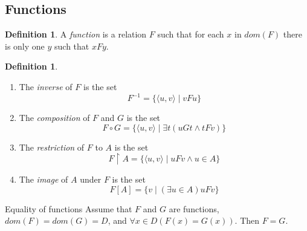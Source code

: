 \documentclass[letterpaper, 10pt]{article}
\numberwithin{thm}{section}
\theoremstyle{definition}
\newtheorem{mydef}[thm]{Definition}
\newcommand{\opair}[2]{\langle{#1}, {#2} \rangle}
\newcommand{\myset}[2]{\{{#1} \mid {#2}\}}
\begin{document}
\subsection{Functions}

\begin{mydef}
	A \emph{function} is a relation $F$ such that for each $x$ in $dom(F)$
	there is only one $y$ such that $xFy$.
\end{mydef}

\begin{mydef}
	\begin{enumerate}[label=(\alph*)]
		\item The \emph{inverse} of $F$ is the set
			\begin{equation*}
				F^{-1} = \myset{\opair{u}{v}}{vFu}
			\end{equation*}
		\item The \emph{composition} of $F$ and $G$ is the set
			\begin{equation*}
				F \circ G = \myset{\opair{u}{v}}{\exists t (uGt \land tFv)}
			\end{equation*}
		\item The \emph{restriction} of $F$ to $A$ is the set
			\begin{equation*}
				F \restriction A = \myset{\opair{u}{v}}{uFv \land u \in A}
			\end{equation*}
		\item The \emph{image} of $A$ under $F$ is the set
			\begin{equation*}
				F[A] = \myset{v}{(\exists u \in A)uFv}
			\end{equation*}
	\end{enumerate}
\end{mydef}

Equality of functions
Assume that $F$ and $G$ are functions, $dom(F) = dom(G) = D$, and $\forall x
\in D (F(x) = G(x))$. Then $F = G$.
\end{document}
